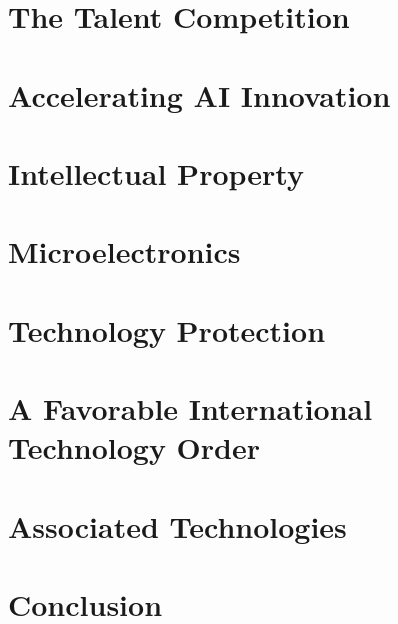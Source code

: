 \documentclass[11pt, a4]{article}
\begin{document}
\section{The Talent Competition}

\section{Accelerating AI Innovation}

\section{Intellectual Property}

\section{Microelectronics}

\section{Technology Protection}

\section{A Favorable International Technology Order}

\section{Associated Technologies}

\section{Conclusion}

\appendix

\newpage
\printbibliography
\end{document}
